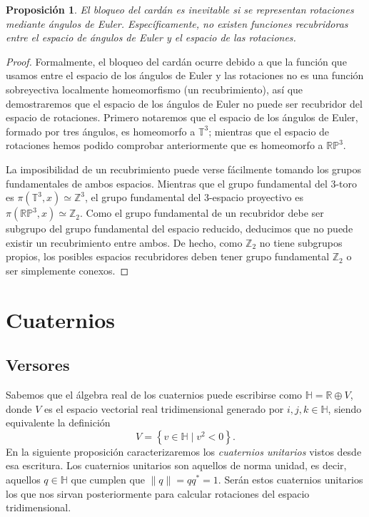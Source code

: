 \documentclass{article}
\theoremstyle{plain}
\newtheorem{proposition}{Proposición}
\theoremstyle{definition}
\theoremstyle{remark}
\begin{document}
\begin{proposition}
  El bloqueo del cardán es inevitable si se representan rotaciones
  mediante ángulos de Euler. Específicamente, no existen funciones
  recubridoras entre el espacio de ángulos de Euler y el espacio de
  las rotaciones.
\end{proposition}
\begin{proof}
  Formalmente, el bloqueo del cardán ocurre debido a que la función
  que usamos entre el espacio de los ángulos de Euler y las rotaciones
  no es una función sobreyectiva localmente homeomorfismo (un
  recubrimiento), así que demostraremos que el espacio de los ángulos
  de Euler no puede ser recubridor del espacio de rotaciones. Primero
  notaremos que el espacio de los ángulos de Euler, formado por tres
  ángulos, es homeomorfo a $\mathbb T^3$; mientras que el espacio de
  rotaciones hemos podido comprobar anteriormente que es homeomorfo a
  $\mathbb{RP}^3$.

  La imposibilidad de un recubrimiento puede verse fácilmente tomando
  los grupos fundamentales de ambos espacios. Mientras que el grupo
  fundamental del 3-toro es $\pi(\mathbb T^3, x) \simeq \mathbb Z^3$,
  el grupo fundamental del 3-espacio proyectivo es
  $\pi(\mathbb{RP}^3, x) \simeq \mathbb Z_2$. Como el grupo
  fundamental de un recubridor debe ser subgrupo del grupo fundamental
  del espacio reducido, deducimos que no puede existir un
  recubrimiento entre ambos. De hecho, como $\mathbb Z_2$ no tiene subgrupos
  propios, los posibles espacios recubridores deben tener grupo
  fundamental $\mathbb Z_2$ o ser simplemente conexos.
\end{proof}

\section{Cuaternios}
\subsection{Versores}
Sabemos que el álgebra real de los cuaternios puede escribirse como
$\mathbb{H} = \mathbb{R} \oplus V$, donde $V$ es el espacio vectorial
real tridimensional generado por $i,j,k \in \mathbb{H}$, siendo equivalente la
definición
\[
  V = \left\{ v \in \mathbb{H} \mid v^2 < 0 \right\}.
\]
En la siguiente proposición caracterizaremos los \textit{cuaternios unitarios}
vistos desde esa escritura. Los cuaternios unitarios son aquellos de norma
unidad, es decir, aquellos $q \in \mathbb{H}$ que cumplen que
$\|q\| = qq^\ast = 1$. Serán estos cuaternios unitarios los que nos sirvan
posteriormente para calcular rotaciones del espacio tridimensional.
\end{document}
